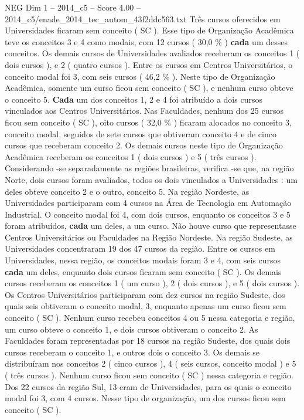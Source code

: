 \begin{textsample}{NEG Dim 1 – 2014\_c5 – Score 4.00 – 2014\_c5/enade\_2014\_tec\_autom\_43f2ddc563.txt}
Três cursos oferecidos em Universidades ficaram sem conceito ( SC ).
Esse tipo de Organização Acadêmica teve os conceitos 3 e 4 como modais, com 12 cursos ( 30,0 \% ) \textbf{cada} um desses conceitos.
Os demais cursos de Universidades avaliados receberam os conceitos 1 ( dois cursos ), e 2 ( quatro cursos ).
Entre os cursos em Centros Universitários, o conceito modal foi 3, com seis cursos ( 46,2 \% ).
Neste tipo de Organização Acadêmica, somente um curso ficou sem conceito ( SC ), e nenhum curso obteve o conceito 5. \textbf{Cada} um dos conceitos 1, 2 e 4 foi atribuído a dois cursos vinculados aos Centros Universitários.
Nas Faculdades, nenhum dos 25 cursos ficou sem conceito ( SC ), oito cursos ( 32,0 \% ) ficaram alocados no conceito 3, conceito modal, seguidos de sete cursos que obtiveram conceito 4 e de cinco cursos que receberam conceito 2.
Os demais cursos neste tipo de Organização Acadêmica receberam os conceitos 1 ( dois cursos ) e 5 ( três cursos ).
Considerando -se separadamente as regiões brasileiras, verifica -se que, na região Norte, dois cursos foram avaliados, todos os dois vinculados a Universidades : um deles obteve conceito 2 e o outro, conceito 5.
Na região Nordeste, as Universidades participaram com 4 cursos na Área de Tecnologia em Automação Industrial.
O conceito modal foi 4, com dois cursos, enquanto os conceitos 3 e 5 foram atribuídos, \textbf{cada} um deles, a um curso.
Não houve curso que representasse Centros Universitários ou Faculdades na Região Nordeste.
Na região Sudeste, as Universidades concentraram 19 dos 47 cursos da região.
Entre os cursos em Universidades, nessa região, os conceitos modais foram 3 e 4, com seis cursos \textbf{cada} um deles, enquanto dois cursos ficaram sem conceito ( SC ).
Os demais cursos receberam os conceitos 1 ( um curso ), 2 ( dois cursos ), e 5 ( dois cursos ).
Os Centros Universitários participaram com dez cursos na região Sudeste, dos quais seis obtiveram o conceito modal, 3, enquanto apenas um curso ficou sem conceito ( SC ).
Nenhum curso recebeu conceitos 4 ou 5 nessa categoria e região, um curso obteve o conceito 1, e dois cursos obtiveram o conceito 2.
As Faculdades foram representadas por 18 cursos na região Sudeste, dos quais dois cursos receberam o conceito 1, e outros dois o conceito 3.
Os demais se distribuíram nos conceitos 2 ( cinco cursos ), 4 ( seis cursos, conceito modal ) e 5 ( três cursos ).
Nenhum curso ficou sem conceito ( SC ) nessa categoria e região.
Dos 22 cursos da região Sul, 13 eram de Universidades, para os quais o conceito modal foi 3, com 4 cursos.
Nesse tipo de organização, um dos cursos ficou sem conceito ( SC ).

\end{textsample}
